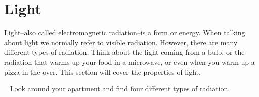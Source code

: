 \documentclass[main.tex]{subfiles}
\begin{document}
\section{Light}
Light--also called electromagnetic radiation--is a form or energy. When talking about light we normally refer to visible radiation. However, there are many different types of radiation. Think about the light coming from a bulb, or the radiation that warms up your food in a microwave, or even when you warm up a pizza in the over. This section will cover the properties of light.
  \begin{marginfigure}
\begin{tcolorbox}[enhanced,colback=red!5!white,colframe=black!50!red,boxrule=1pt,
  arc=0pt,outer arc=0pt,drop heavy lifted shadow]
\faGears\ 
 Look around your apartment and find four different types of radiation.\end{tcolorbox}
 \end{marginfigure}
\sloppy
\end{document}

